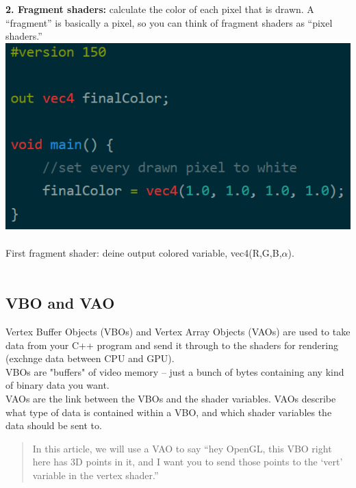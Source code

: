 \documentclass{article}
\begin{document}
\textbf{2. Fragment shaders: }  calculate the color of each pixel that is drawn. A “fragment” is basically a pixel, so you can think of fragment shaders as “pixel shaders.”  
\includegraphics[scale=0.6]{2.png}\\\\
First fragment shader: deine output colored variable, vec4(R,G,B,$\alpha$).\\\\

\subsection{VBO and VAO}
Vertex Buffer Objects (VBOs) and Vertex Array Objects (VAOs) are used to take data from your C++ program and send it through to the shaders for rendering (exchnge data between CPU and GPU). \\
VBOs are "buffers" of video memory – just a bunch of bytes containing any kind of binary data you want.\\
VAOs are the link between the VBOs and the shader variables. VAOs describe what type of data is contained within a VBO, and which shader variables the data should be sent to.
\begin{quote}
In this article, we will use a VAO to say “hey OpenGL, this VBO right here has 3D points in it, and I want you to send those points to the ‘vert’ variable in the vertex shader.”
\end{quote}
\end{document}
